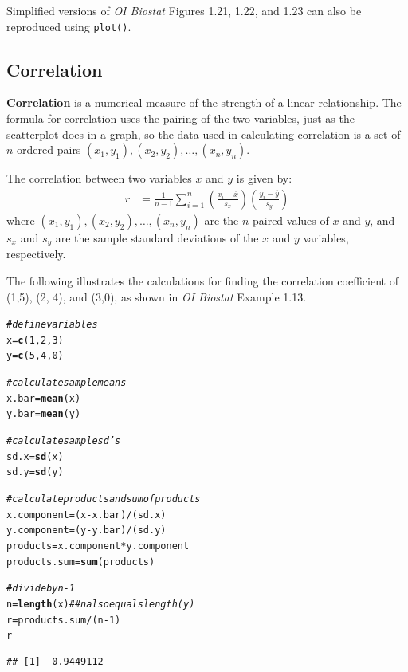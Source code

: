 \documentclass{report}\usepackage[]{graphicx}\usepackage[]{color}
\makeatletter
\newcommand{\hlnum}[1]{\textcolor[rgb]{0.686,0.059,0.569}{#1}}%
\newcommand{\hlcom}[1]{\textcolor[rgb]{0.678,0.584,0.686}{\textit{#1}}}%
\newcommand{\hlopt}[1]{\textcolor[rgb]{0,0,0}{#1}}%
\newcommand{\hlstd}[1]{\textcolor[rgb]{0.345,0.345,0.345}{#1}}%
\newcommand{\hlkwb}[1]{\textcolor[rgb]{0.69,0.353,0.396}{#1}}%
\newcommand{\hlkwd}[1]{\textcolor[rgb]{0.737,0.353,0.396}{\textbf{#1}}}%
\newenvironment{kframe}{%
 \def\at@end@of@kframe{}%
 \ifinner\ifhmode%
  \def\at@end@of@kframe{\end{minipage}}%
  \begin{minipage}{\columnwidth}%
 \fi\fi%
 \def\FrameCommand##1{\hskip\@totalleftmargin \hskip-\fboxsep
 \colorbox{shadecolor}{##1}\hskip-\fboxsep
     \hskip-\linewidth \hskip-\@totalleftmargin \hskip\columnwidth}%
 \MakeFramed {\advance\hsize-\width
   \@totalleftmargin\z@ \linewidth\hsize
   \@setminipage}}%
 {\par\unskip\endMakeFramed%
 \at@end@of@kframe}
\newenvironment{knitrout}{}{} %
\makeatother
\begin{document}
Simplified versions of \textit{OI Biostat} Figures 1.21, 1.22, and 1.23 can also be reproduced using \texttt{plot()}.

\subsection{Correlation}

\textbf{Correlation} is a numerical measure of the strength of a linear relationship. The formula for correlation uses the pairing of the two variables, just as the scatterplot does in a graph, so the data used in calculating correlation is a set of $n$ ordered pairs $(x_1,y_1), (x_2,y_2), \ldots, (x_n, y_n) $.

The correlation between two variables $x$ and $y$ is given by:
		\begin{align*}
          r &=  \frac{1}{n-1}\sum^{n}_{i=1}
          \left(\frac{x_{i}-\overline{x}}
          {s_{x}}\right)\left(\frac{y_{i}-\overline{y}}{s_{y}}\right)
    \end{align*}      
where $(x_1,y_1), (x_2,y_2), \ldots, (x_n, y_n)$ are the $n$ paired values of $x$ and $y$, and $s_x$ and $s_y$ are the sample standard deviations of the $x$ and $y$ variables, respectively.     

The following illustrates the calculations for finding the correlation coefficient of (1,5), (2, 4), and (3,0), as shown in \textit{OI Biostat} Example 1.13.

\begin{knitrout}
\color{fgcolor}\begin{kframe}
\begin{alltt}
\hlcom{# define variables}
\hlstd{x} \hlkwb{=} \hlkwd{c}\hlstd{(}\hlnum{1}\hlstd{,} \hlnum{2}\hlstd{,} \hlnum{3}\hlstd{)}
\hlstd{y} \hlkwb{=} \hlkwd{c}\hlstd{(}\hlnum{5}\hlstd{,} \hlnum{4}\hlstd{,} \hlnum{0}\hlstd{)}

\hlcom{# calculate sample means}
\hlstd{x.bar} \hlkwb{=} \hlkwd{mean}\hlstd{(x)}
\hlstd{y.bar} \hlkwb{=} \hlkwd{mean}\hlstd{(y)}

\hlcom{# calculate sample sd's}
\hlstd{sd.x} \hlkwb{=} \hlkwd{sd}\hlstd{(x)}
\hlstd{sd.y} \hlkwb{=} \hlkwd{sd}\hlstd{(y)}

\hlcom{# calculate products and sum of products}
\hlstd{x.component} \hlkwb{=} \hlstd{(x} \hlopt{-} \hlstd{x.bar)}\hlopt{/}\hlstd{(sd.x)}
\hlstd{y.component} \hlkwb{=} \hlstd{(y} \hlopt{-} \hlstd{y.bar)}\hlopt{/}\hlstd{(sd.y)}
\hlstd{products} \hlkwb{=} \hlstd{x.component} \hlopt{*} \hlstd{y.component}
\hlstd{products.sum} \hlkwb{=} \hlkwd{sum}\hlstd{(products)}

\hlcom{# divide by n - 1}
\hlstd{n} \hlkwb{=} \hlkwd{length}\hlstd{(x)}   \hlcom{## n also equals length(y)}
\hlstd{r} \hlkwb{=} \hlstd{products.sum} \hlopt{/} \hlstd{(n} \hlopt{-} \hlnum{1}\hlstd{)}
\hlstd{r}
\end{alltt}
\begin{verbatim}
## [1] -0.9449112
\end{verbatim}
\end{kframe}
\end{knitrout}
\end{document}
